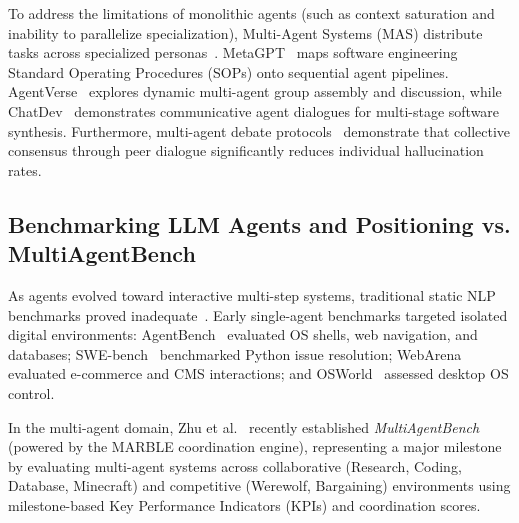 To address the limitations of monolithic agents (such as context saturation and inability to parallelize specialization), Multi-Agent Systems (MAS) distribute tasks across specialized personas~\cite{Wu2024AutoGen,Li2023CAMEL}. MetaGPT~\cite{Hong2024MetaGPT} maps software engineering Standard Operating Procedures (SOPs) onto sequential agent pipelines. AgentVerse~\cite{Chen2024AgentVerse} explores dynamic multi-agent group assembly and discussion, while ChatDev~\cite{Qian2024Communicative} demonstrates communicative agent dialogues for multi-stage software synthesis. Furthermore, multi-agent debate protocols~\cite{Du2024Improving,Yin2023Exchange} demonstrate that collective consensus through peer dialogue significantly reduces individual hallucination rates.

\subsection{Benchmarking LLM Agents and Positioning vs. MultiAgentBench}
As agents evolved toward interactive multi-step systems, traditional static NLP benchmarks proved inadequate~\cite{Chang2024Survey}. Early single-agent benchmarks targeted isolated digital environments: AgentBench~\cite{Liu2024AgentBench} evaluated OS shells, web navigation, and databases; SWE-bench~\cite{Jimenez2024SWEbench} benchmarked Python issue resolution; WebArena~\cite{Zhou2024WebArena} evaluated e-commerce and CMS interactions; and OSWorld~\cite{Xie2024OSWorld} assessed desktop OS control.

In the multi-agent domain, Zhu et al.~\cite{Zhu2025MultiAgentBench} recently established \textit{MultiAgentBench} (powered by the MARBLE coordination engine), representing a major milestone by evaluating multi-agent systems across collaborative (Research, Coding, Database, Minecraft) and competitive (Werewolf, Bargaining) environments using milestone-based Key Performance Indicators (KPIs) and coordination scores.


